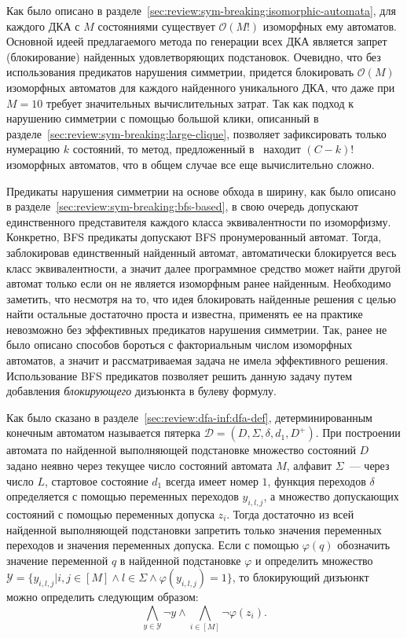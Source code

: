 Как было описано в разделе~\ref{sec:review:sym-breaking:isomorphic-automata}, для каждого ДКА с $M$ состояниями существует $\mathcal{O}\left(M!\right)$ изоморфных ему автоматов.
Основной идеей предлагаемого метода по генерации всех ДКА является запрет (блокирование) найденных удовлетворяющих подстановок.
Очевидно, что без использования предикатов нарушения симметрии, придется блокировать $\mathcal{O}\left(M\right)$ изоморфных автоматов для каждого найденного уникального ДКА, что даже при $M = 10$ требует значительных вычислительных затрат.
Так как подход к нарушению симметрии с помощью большой клики, описанный в разделе~\ref{sec:review:sym-breaking:large-clique}, позволяет зафиксировать только нумерацию $k$ состояний, то метод, предложенный в~\cite{heule-icgi10} находит $\left(C - k\right)!$ изоморфных автоматов, что в общем случае все еще вычислительно сложно.

Предикаты нарушения симметрии на основе обхода в ширину, как было описано в разделе~\ref{sec:review:sym-breaking:bfs-based}, в свою очередь допускают единственного представителя каждого класса эквивалентности по изоморфизму.
Конкретно, BFS предикаты допускают BFS пронумерованный автомат.
Тогда, заблокировав единственный найденный автомат, автоматически блокируется весь класс эквивалентности, а значит далее программное средство может найти другой автомат только если он не является изоморфным ранее найденным.
Необходимо заметить, что несмотря на то, что идея блокировать найденные решения с целью найти остальные достаточно проста и известна, применять ее на практике невозможно без эффективных предикатов нарушения симметрии.
Так, ранее не было описано способов бороться с факториальным числом изоморфных автоматов, а значит и рассматриваемая задача не имела эффективного решения.
Использование BFS предикатов позволяет решить данную задачу путем добавления \emph{блокирующего} дизъюнкта в булеву формулу. 

Как было сказано в разделе~\ref{sec:review:dfa-inf:dfa-def}, детерминированным конечным автоматом называется пятерка $\mathcal{D} = \left(D,\Sigma,\delta,d_{1},D^{+}\right)$.
При построении автомата по найденной выполняющей подстановке множество состояний $D$ задано неявно через текущее число состояний автомата $M$, алфавит $\Sigma$~{---} через число $L$, стартовое состояние $d_{1}$ всегда имеет номер $1$, функция переходов $\delta$ определяется с помощью переменных переходов $y_{i,l,j}$, а множество допускающих состояний с помощью переменных допуска $z_{i}$.
Тогда достаточно из всей найденной выполняющей подстановки запретить только значения переменных переходов и значения переменных допуска.
Если с помощью $\varphi\left(q\right)$ обозначить значение переменной $q$ в найденной подстановке $\varphi$ и определить множество $\mathcal{Y} = \{y_{i,l,j} | i,j \in \left[M\right] \wedge l \in \Sigma \wedge \varphi\left(y_{i,l,j}\right) = 1\}$, то блокирующий дизъюнкт можно определить следующим образом: $$\bigwedge_{y \in \mathcal{Y}} \neg y \wedge \bigwedge_{i \in \left[M\right]}\neg \varphi\left(z_{i}\right).$$

